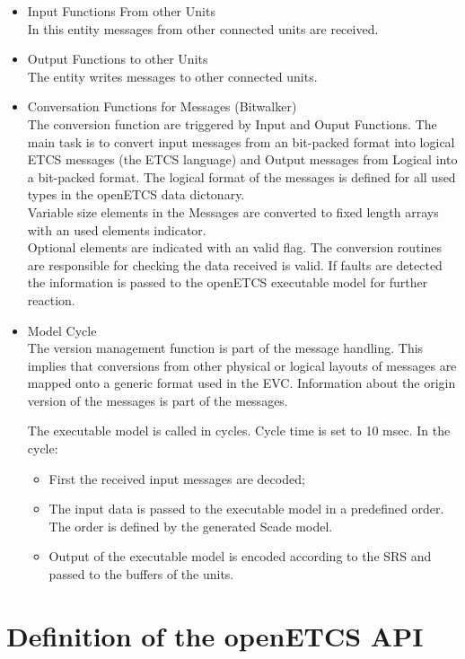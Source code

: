 \documentclass{template/openetcs_report}
\begin{document}
\begin{itemize}
\item Input Functions From other Units\\
In this entity messages from other connected units are received.
\item Output Functions to other Units\\
The entity writes messages to other connected units.
\item Conversation Functions for Messages (Bitwalker)\\
The conversion function are triggered by Input and Ouput Functions. The main task is to convert input messages from an bit-packed format into logical ETCS messages (the ETCS language) and Output messages from Logical into a bit-packed format. The logical format of the messages is defined for all used types in the openETCS data dictonary. \\
Variable size elements in the Messages are converted to fixed length arrays with an used elements indicator.\\
Optional elements are indicated with an valid flag.
The conversion routines are responsible for checking the data received is valid. If  faults are detected the information is passed to the openETCS executable model for further reaction. 
\item Model Cycle\\

The version management function is part of the message handling. This implies that conversions from other physical or logical layouts of messages are mapped onto a generic format used in the EVC. Information about the origin version of the messages is part of the messages.
 
The executable model is called in cycles. Cycle time is set to 10 msec. In the cycle:
\begin{itemize}
\item First the received input messages are decoded;
\item The input data is passed to the executable model in a predefined order. The order is defined by the generated Scade model.
\item Output of the executable model is encoded according to the SRS and passed to the buffers of the units.
\end{itemize}
\end{itemize}


\chapter{Definition of the openETCS API}
\end{document}
